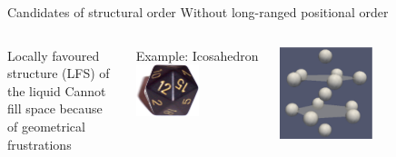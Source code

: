 \begin{frame}{Candidates of structural order}
\small{Without long-ranged positional order}
\begin{columns}
\begin{block}{Locally favoured structure (LFS) of the liquid}
Cannot fill space because of geometrical frustrations

\centering{}
\end{block}
Example: Icosahedron
\centering\includegraphics[width=0.5\textwidth]{d20.png}

\includegraphics[width=0.5\textwidth]{ico_13}
\end{columns}
\end{frame}

